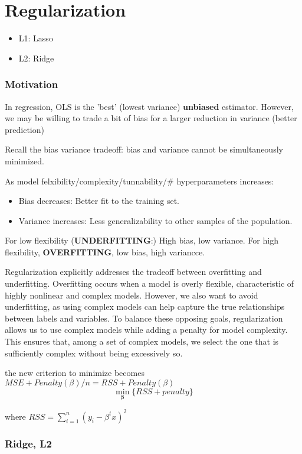 \documentclass{article}
\begin{document}
\section{Regularization}
\begin{itemize}
\item L1: Lasso
\item L2: Ridge
\end{itemize}

\subsubsection{Motivation}
In regression, OLS is the 'best' (lowest variance) \textbf{unbiased} estimator. 
However, we may be willing to trade a bit of bias for a larger reduction in variance (better prediction)

Recall the bias variance tradeoff:  bias and variance cannot be simultaneously minimized.

As model felxibility/complexity/tunnability/\# hyperparameters increases:
\begin{itemize}
\item Bias decreases: Better fit to the training set. 
\item Variance increases: Less generalizability to other samples of the population.
\end{itemize}

For low flexibility (\textbf{UNDERFITTING}:) High bias, low variance. For high flexibility, \textbf{OVERFITTING}, low bias, high variancce. 

Regularization explicitly addresses the tradeoff between overfitting and underfitting. Overfitting occurs when a model is overly flexible, characteristic of highly nonlinear and complex models. However, we also want to avoid underfitting, as using complex models can help capture the true relationships between labels and variables. To balance these opposing goals, regularization allows us to use complex models while adding a penalty for model complexity. This ensures that, among a set of complex models, we select the one that is sufficiently complex without being excessively so.

the new criterion to minimize becomes $MSE + Penalty(\beta)/n = RSS + Penalty(\beta)$
\[ \min_{\bm \beta} \{ RSS + penalty \}\]

where $RSS = \sum_{i=1}^n (y_i- \beta^t x)^2$

\subsubsection{Ridge, L2}
\end{document}
